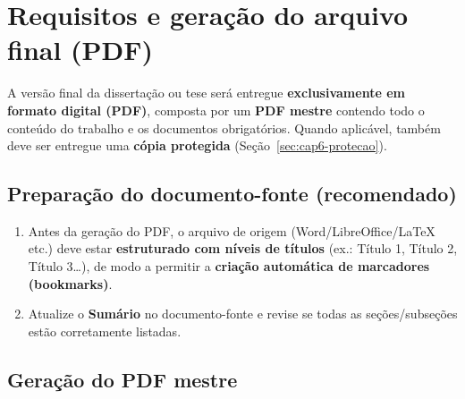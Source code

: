 \section{Requisitos e geração do arquivo final (PDF)}

A versão final da dissertação ou tese será entregue \textbf{exclusivamente em formato digital (PDF)}, composta por um \textbf{PDF mestre} contendo todo o conteúdo do trabalho e os documentos obrigatórios. Quando aplicável, também deve ser entregue uma \textbf{cópia protegida} (Seção~\ref{sec:cap6-protecao}).

\subsection{Preparação do documento-fonte (recomendado)}

\begin{enumerate}
    \item Antes da geração do PDF, o arquivo de origem (Word/LibreOffice/\LaTeX{} etc.) deve estar \textbf{estruturado com níveis de títulos} (ex.: Título 1, Título 2, Título 3\ldots), de modo a permitir a \textbf{criação automática de marcadores (bookmarks)}.
    \item Atualize o \textbf{Sumário} no documento-fonte e revise se todas as seções/subseções estão corretamente listadas.
\end{enumerate}

\subsection{Geração do PDF mestre}


